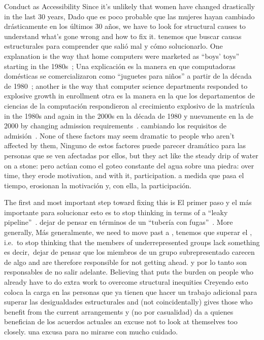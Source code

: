 \begin{aside}{Conduct as Accessibility}
Since it's unlikely that women have changed drastically in the last 30 years,
Dado que es poco probable que las mujeres hayan cambiado drásticamente en los últimos 30 años,
we have to look for structural causes to understand what's gone wrong and how to fix it.
tenemos que buscar causas estructurales para comprender que salió mal y cómo solucionarlo.
One explanation is the way that home computers were marketed as ``boys' toys'' starting in the 1980s~\cite{Marg2003};
Una explicación es la manera en que computadoras domésticas se comercializaron como ``juguetes para niños'' a partir de la década de 1980~\cite{Marg2003};
another is the way that computer science departments responded to explosive growth in enrollment
otra es la manera en la que los departamentos de ciencias de la computación respondieron al crecimiento explosivo de la matrícula
in the 1980s and again in the 2000s
en la década de 1980 y nuevamente en la de 2000
by changing admission requirements~\cite{Robe2017}.
cambiando los requisitos de admisión~\cite{Robe2017}.
None of these factors may seem dramatic to people who aren't affected by them,
Ninguno de estos factores puede parecer dramático para las personas que se ven afectadas por ellos,
but they act like the steady drip of water on a stone:
pero actúan como el goteo constante del agua sobre una piedra:
over time, they erode motivation, and with it, participation.
a medida que pasa el tiempo, erosionan la motivación y, con ella, la participación.

The first and most important step toward fixing this is
El primer paso y el más importante para solucionar esto es
to stop thinking in terms of a ``leaky pipeline''~\cite{Mill2015}.
dejar de pensar en términos de un ``tubería con fugas''~\cite{Mill2015}.
More generally,
Más generalmente,
we need to move past a ,
tenemos que superar el ,
i.e.\ to stop thinking that the members of underrepresented groups lack something
es decir,\ dejar de pensar que los miembros de un grupo subrepresentado carecen de algo
and are therefore responsible for not getting ahead.
y por lo tanto son responsables de no salir adelante.
Believing that puts the burden on people who already have to do extra work to overcome structural inequities
Creyendo esto coloca la carga en las personas que ya tienen que hacer un trabajo adicional para superar las desigualdades estructurales
and (not coincidentally) gives those who benefit from the current arrangements
y (no por casualidad) da a quienes benefician de los acuerdos actuales
an excuse not to look at themselves too closely.
una excusa para no mirarse con mucho cuidado.


\end{aside}
